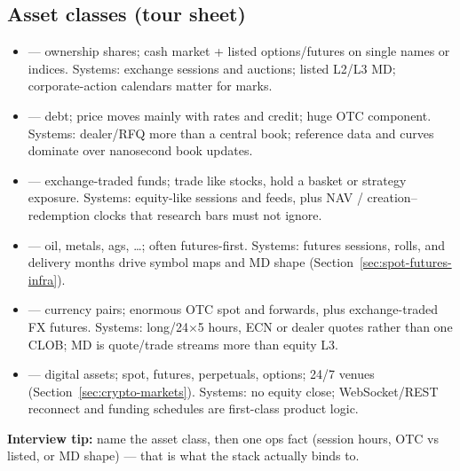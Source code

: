 \subsection{Asset classes (tour sheet)}
\label{subsec:asset-classes}
\begin{itemize}
    \item {} --- ownership shares; cash market + listed 
          options/futures on single names or indices.
          Systems: exchange sessions and auctions; listed L2/L3 MD; corporate-action 
          calendars matter for marks.
    \item {} --- debt; price moves mainly with rates and credit; 
          huge OTC component.
          Systems: dealer/RFQ more than a central book; reference data and curves 
          dominate over nanosecond book updates.
    \item {} --- exchange-traded funds; trade like stocks, hold a 
          basket or strategy exposure.
          Systems: equity-like sessions and feeds, plus NAV / creation--redemption 
          clocks that research bars must not ignore.
    \item {} --- oil, metals, ags, \ldots; often futures-first.
          Systems: futures sessions, rolls, and delivery months drive symbol maps 
          and MD shape (Section~\ref{sec:spot-futures-infra}).
    \item {} --- currency pairs; enormous OTC spot 
          and forwards, plus exchange-traded FX futures.
          Systems: long/24$\times$5 hours, ECN or dealer quotes rather than one CLOB; 
          MD is quote/trade streams more than equity L3.
    \item {} --- digital assets; spot, futures, perpetuals, options; 
          24/7 venues (Section~\ref{sec:crypto-markets}).
          Systems: no equity close; WebSocket/REST reconnect and funding schedules 
          are first-class product logic.
\end{itemize}
\par\noindent\textbf{Interview tip:} name the asset class, then one ops fact 
(session hours, OTC vs listed, or MD shape) --- that is what the stack actually binds to.

